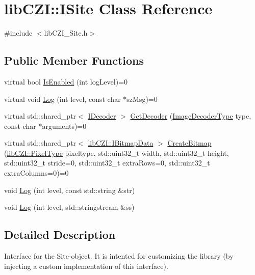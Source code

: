 \hypertarget{classlib_c_z_i_1_1_i_site}{}\section{lib\+C\+ZI\+:\+:I\+Site Class Reference}
\label{classlib_c_z_i_1_1_i_site}


{\ttfamily \#include $<$lib\+C\+Z\+I\+\_\+\+Site.\+h$>$}

\subsection*{Public Member Functions}
\begin{DoxyCompactItemize}
\item 
virtual bool \hyperlink{classlib_c_z_i_1_1_i_site_a56c0d12cfa78ecb83fb5bbd0f500ee30}{Is\+Enabled} (int log\+Level)=0
\item 
virtual void \hyperlink{classlib_c_z_i_1_1_i_site_aa709ab923626e1a17898b3d6802c2082}{Log} (int level, const char $\ast$sz\+Msg)=0
\item 
virtual std\+::shared\+\_\+ptr$<$ \hyperlink{classlib_c_z_i_1_1_i_decoder}{I\+Decoder} $>$ \hyperlink{classlib_c_z_i_1_1_i_site_a2cbf7eccd867378b4943519284b98ef1}{Get\+Decoder} (\hyperlink{namespacelib_c_z_i_a68cd7521fd89880f820ea55baf6f6179}{Image\+Decoder\+Type} type, const char $\ast$arguments)=0
\item 
virtual std\+::shared\+\_\+ptr$<$ \hyperlink{classlib_c_z_i_1_1_i_bitmap_data}{lib\+C\+Z\+I\+::\+I\+Bitmap\+Data} $>$ \hyperlink{classlib_c_z_i_1_1_i_site_ab1b59f522c0dfdce2474036e4ac6cc23}{Create\+Bitmap} (\hyperlink{namespacelib_c_z_i_abf8ce12ab88b06c8b3b47efbb5e2e834}{lib\+C\+Z\+I\+::\+Pixel\+Type} pixeltype, std\+::uint32\+\_\+t width, std\+::uint32\+\_\+t height, std\+::uint32\+\_\+t stride=0, std\+::uint32\+\_\+t extra\+Rows=0, std\+::uint32\+\_\+t extra\+Columns=0)=0
\item 
void \hyperlink{classlib_c_z_i_1_1_i_site_af879b88237db67ebf48f9c48fc15f57f}{Log} (int level, const std\+::string \&str)
\item 
void \hyperlink{classlib_c_z_i_1_1_i_site_a3485af37a7034750ee9d90efa9fcf2c7}{Log} (int level, std\+::stringstream \&ss)
\end{DoxyCompactItemize}


\subsection{Detailed Description}
Interface for the Site-\/object. It is intented for customizing the library (by injecting a custom implementation of this interface). 

